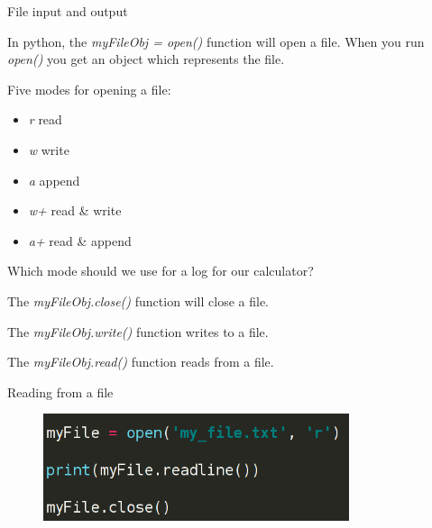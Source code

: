 \documentclass{beamer}
\begin{document}
\begin{frame}{File input and output}

\pause

In python, the \textit{myFileObj = open()} function will open a file. \pause When you run \textit{open()} you get an object which represents the file.

\pause

Five modes for opening a file: \pause 

\begin{itemize}
  \item \textit{r} \pause \qquad read \pause
  \item \textit{w} \pause \qquad write \pause
  \item \textit{a} \pause \qquad append \pause
  \item \textit{w+} \pause \qquad read \& write \pause
  \item \textit{a+} \pause \qquad read \& append
  
\end{itemize}

\pause

Which mode should we use for a log for our calculator?

\end{frame}

\begin{frame}


The \textit{myFileObj.close()} function will close a file.

\pause

The \textit{myFileObj.write()} function writes to a file.

\pause

The \textit{myFileObj.read()} function reads from a file.

\end{frame}


\begin{frame}{Reading from a file}

\begin{figure}[h]
\includegraphics[width=0.8\textwidth]{fileread}
\end{figure}


\end{frame}
\end{document}
